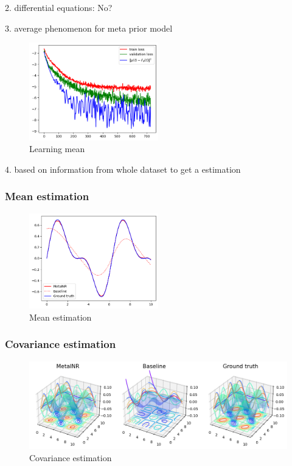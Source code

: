 \documentclass{article}
\begin{document}
2. differential equations: No?

3. average phenomenon for meta prior model
\begin{figure}
  \centering
  \includegraphics[width=0.5\textwidth]{learning_mean_loss.png}
  \caption{Learning mean}
\end{figure}

4. based on information from whole dataset to get a estimation 
\subsubsection{Mean estimation}

\begin{figure}
  \centering
  \includegraphics[width=0.5\textwidth]{mean.png}
  \caption{Mean estimation}
\end{figure}
\subsubsection{Covariance estimation}

\begin{figure}
  \centering
  \includegraphics[width=\textwidth]{covariance.png}
  \caption{Covariance estimation}
\end{figure}
\end{document}
